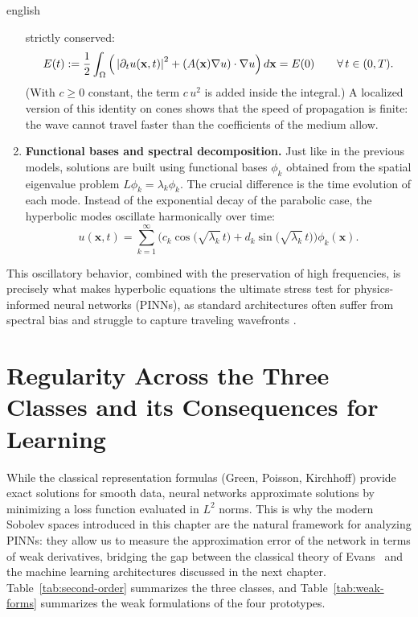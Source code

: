 \begin{hyphenrules}{english}
\begin{enumerate}
    strictly conserved:
    \begin{equation}
      E(t):=\frac12\int_\Omega\Big(\abs{\partial_t u(\mathbf{x},t)}^2+(A(\mathbf{x})\nabla u)\cdot\nabla u\Big)\,d\mathbf{x}=E(0)
      \qquad\forall\,t\in(0,T).
      \label{eq:energy-conservation}
    \end{equation}
    (With $c\ge0$ constant, the term $c\,u^2$ is added inside the integral.) A localized version of
    this identity on cones shows that the speed of propagation is finite: the wave cannot travel faster
    than the coefficients of the medium allow.
  \item \textbf{Functional bases and spectral decomposition.} Just like in the previous models,
    solutions are built using functional bases $\phi_k$ obtained from the spatial eigenvalue problem
    $L\phi_k=\lambda_k\phi_k$. The crucial difference is the time evolution of each mode. Instead of
    the exponential decay of the parabolic case, the hyperbolic modes oscillate harmonically over time:
    \begin{equation}
      u(\mathbf{x},t)=\sum_{k=1}^{\infty}\Big(c_k\cos\big(\sqrt{\lambda_k}\,t\big)+d_k\sin\big(\sqrt{\lambda_k}\,t\big)\Big)\phi_k(\mathbf{x}).
      \label{eq:hyperbolic-modes}
    \end{equation}
\end{enumerate}
This oscillatory behavior, combined with the preservation of high frequencies, is precisely what makes
hyperbolic equations the ultimate stress test for physics-informed neural networks (PINNs), as standard
architectures often suffer from spectral bias and struggle to capture traveling wavefronts
\cite{wang2021eigenvector,wang2022ntk}.

\section[Regularity and its Consequences for Learning]{Regularity Across the Three Classes and its Consequences for Learning}\label{sec:regularity-bridge}

While the classical representation formulas (Green, Poisson, Kirchhoff) provide exact solutions for
smooth data, neural networks approximate solutions by minimizing a loss function evaluated in $L^2$
norms. This is why the modern Sobolev spaces introduced in this chapter are the natural framework for
analyzing PINNs: they allow us to measure the approximation error of the network in terms of weak
derivatives, bridging the gap between the classical theory of Evans~\cite{evans2010} and the machine
learning architectures discussed in the next chapter. Table~\ref{tab:second-order} summarizes the three
classes, and Table~\ref{tab:weak-forms} summarizes the weak formulations of the four prototypes.


\end{hyphenrules}
